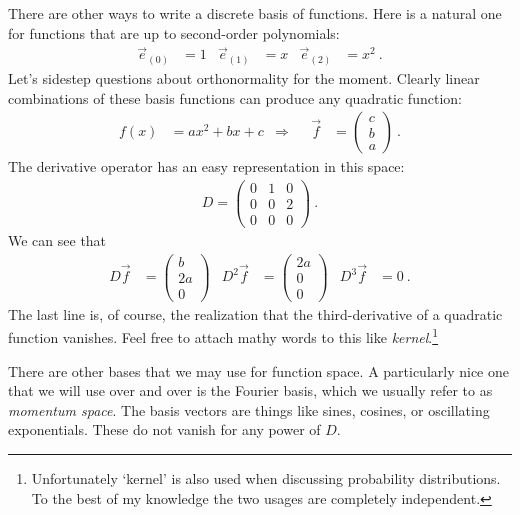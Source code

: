 \documentclass[
  11pt,
	colorful,
	raggedright,
]{tufte-style-thesis-flip}
\begin{document}
There are other ways to write a discrete basis of functions. Here is a natural one for functions that are up to second-order polynomials:
\begin{align}
  \vec{e}_{(0)} &= 1
  &
  \vec{e}_{(1)} &= x
  &
  \vec{e}_{(2)} &= x^2 \ .
\end{align}
Let’s sidestep questions about orthonormality for the moment. Clearly linear combinations of these basis functions can produce any quadratic function:
\begin{align}
  f(x) &= a x^2 + bx + c
  & \Rightarrow&&
  \vec{f} &=
  \begin{pmatrix}
     c \\ b \\ a
   \end{pmatrix} \ . 
\end{align}
The derivative operator has an easy representation in this space:
\begin{align}
  D = 
  \begin{pmatrix}
    0 & 1 & 0   \\
    0 & 0 & 2   \\
    0 & 0 & 0   
  \end{pmatrix} \ .
\end{align}
We can see that
\begin{align}
  D \vec{f}  &= 
  \begin{pmatrix}
     b \\
     2 a \\
     0
  \end{pmatrix} 
  &
  D^2 \vec{f}  &= 
  \begin{pmatrix}
     2a \\
     0 \\
     0
  \end{pmatrix} 
  &
  D^3 \vec{f}  &= 
  0 \ .
\end{align}
The last line is, of course, the realization that the third-derivative of a quadratic function vanishes. Feel free to attach mathy words to this like \emph{kernel}.\footnote{Unfortunately `kernel' is also used when discussing probability distributions. To the best of my knowledge the two usages are completely independent.}

There are other bases that we may use for function space. A particularly nice one that we will use over and over is the Fourier basis, which we usually refer to as \emph{momentum space}. The basis vectors are things like sines, cosines, or oscillating exponentials. These do not vanish for any power of $D$.
\end{document}
